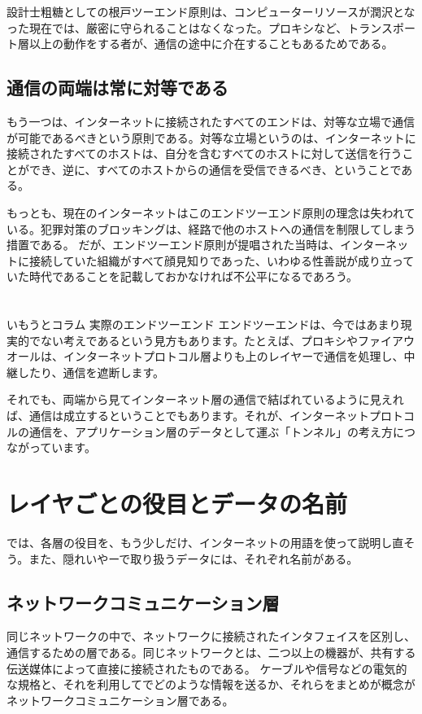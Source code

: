 設計士粗糖としての根戸ツーエンド原則は、コンピューターリソースが潤沢となった現在では、厳密に守られることはなくなった。プロキシなど、トランスポート層以上の動作をする者が、通信の途中に介在することもあるためである。

\subsection{通信の両端は常に対等である}

もう一つは、インターネットに接続されたすべてのエンドは、対等な立場で通信が可能であるべきという原則である。対等な立場というのは、インターネットに接続されたすべてのホストは、自分を含むすべてのホストに対して送信を行うことができ、逆に、すべてのホストからの通信を受信できるべき、ということである。

もっとも、現在のインターネットはこのエンドツーエンド原則の理念は失われている。犯罪対策のブロッキングは、経路で他のホストへの通信を制限してしまう措置である。
だが、エンドツーエンド原則が提唱された当時は、インターネットに接続していた組織がすべて顔見知りであった、いわゆる性善説が成り立っていた時代であることを記載しておかなければ不公平になるであろう。

\section*{}
\begin{itembox}[l]{いもうとコラム 実際のエンドツーエンド}
エンドツーエンドは、今ではあまり現実的でない考えであるという見方もあります。たとえば、プロキシやファイアウオールは、インターネットプロトコル層よりも上のレイヤーで通信を処理し、中継したり、通信を遮断します。

それでも、両端から見てインターネット層の通信で結ばれているように見えれば、通信は成立するということでもあります。それが、インターネットプロトコルの通信を、アプリケーション層のデータとして運ぶ「トンネル」の考え方につながっています。


\end{itembox}


\section{レイヤごとの役目とデータの名前}
では、各層の役目を、もう少しだけ、インターネットの用語を使って説明し直そう。また、隠れいやーで取り扱うデータには、それぞれ名前がある。

\subsection{ネットワークコミュニケーション層}
同じネットワークの中で、ネットワークに接続されたインタフェイスを区別し、通信するための層である。同じネットワークとは、二つ以上の機器が、共有する伝送媒体によって直接に接続されたものである。
ケーブルや信号などの電気的な規格と、それを利用してでどのような情報を送るか、それらをまとめが概念がネットワークコミュニケーション層である。

